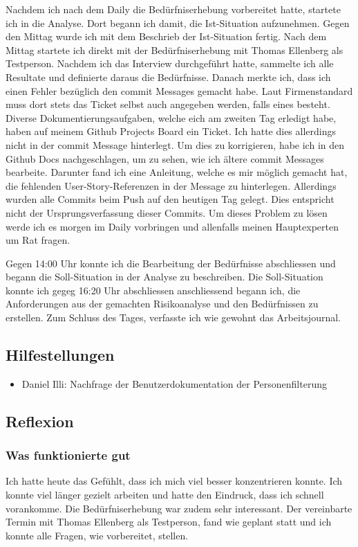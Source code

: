 \newpage

Nachdem ich nach dem Daily die Bedürfniserhebung vorbereitet hatte,
startete ich in die Analyse. Dort begann ich damit, die Ist-Situation aufzunehmen. Gegen den Mittag wurde ich mit dem Beschrieb der 
Ist-Situation fertig. Nach dem Mittag startete ich direkt mit der Bedürfniserhebung mit Thomas Ellenberg als Testperson. Nachdem ich das Interview 
durchgeführt hatte, sammelte ich alle Resultate und definierte daraus die Bedürfnisse. Danach merkte ich, dass ich einen Fehler bezüglich den commit Messages gemacht habe.
Laut Firmenstandard muss dort stets das Ticket selbst auch angegeben werden, falls eines besteht. Diverse Dokumentierungsaufgaben, welche eich am zweiten Tag erledigt habe,
haben auf meinem Github Projects Board ein Ticket. Ich hatte dies allerdings nicht in der commit Message hinterlegt. Um dies zu korrigieren, habe ich in den Github Docs nachgeschlagen,
um zu sehen, wie ich ältere commit Messages bearbeite. Darunter fand ich eine Anleitung, welche es mir möglich gemacht hat, die fehlenden User-Story-Referenzen in der 
Message zu hinterlegen. Allerdings wurden alle Commits beim Push auf den heutigen Tag gelegt. Dies entspricht nicht der Ursprungsverfassung dieser Commits.
Um dieses Problem zu lösen werde ich es morgen im Daily vorbringen und allenfalls meinen Hauptexperten um Rat fragen.

Gegen 14:00 Uhr konnte ich die Bearbeitung der Bedürfnisse
abschliessen und begann die Soll-Situation in der Analyse zu beschreiben. Die Soll-Situation konnte ich gegeg 16:20 Uhr abschliessen anschliessend begann ich,
die Anforderungen aus der gemachten Risikoanalyse und den Bedürfnissen zu erstellen. Zum Schluss des Tages, verfasste ich wie gewohnt das Arbeitsjournal.

\subsection*{Hilfestellungen}
\begin{itemize}
    \item Daniel Illi: Nachfrage der Benutzerdokumentation der Personenfilterung
\end{itemize}

\subsection*{Reflexion}

\subsubsection*{Was funktionierte gut}
Ich hatte heute das Gefühlt, dass ich mich viel besser konzentrieren konnte. Ich konnte viel länger gezielt arbeiten
und hatte den Eindruck, dass ich schnell vorankomme. Die Bedürfniserhebung war zudem sehr interessant. Der vereinbarte Termin
mit Thomas Ellenberg als Testperson, fand wie geplant statt und ich konnte alle Fragen, wie vorbereitet, stellen.

